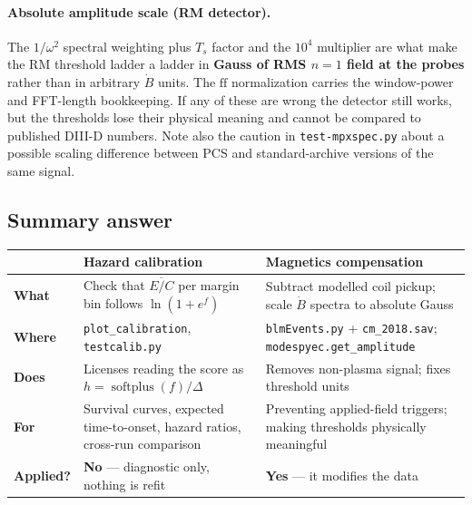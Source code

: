 \documentclass[11pt,a4paper]{article}
\newcommand{\code}[1]{\texttt{\small #1}}
\newcommand{\softplus}{\operatorname{softplus}}
\begin{document}
\paragraph{Absolute amplitude scale (RM detector).} The $1/\omega^2$ spectral weighting plus $T_s$
factor and the $10^4$ multiplier are what make the RM threshold ladder a ladder in \textbf{Gauss of
RMS $n{=}1$ field at the probes} rather than in arbitrary $\dot B$ units. The $\mathrm{ff}$
normalization carries the window-power and FFT-length bookkeeping. If any of these are wrong the
detector still works, but the thresholds lose their physical meaning and cannot be compared to
published DIII-D numbers. Note also the caution in \code{test-mpxspec.py} about a possible scaling
difference between PCS and standard-archive versions of the same signal.

\subsection{Summary answer}

\begin{center}
\begin{tabular}{@{}p{}p{}p{}@{}}
\toprule
& \textbf{Hazard calibration} & \textbf{Magnetics compensation} \\
\midrule
\textbf{What} & Check that $\overline{E/C}$ per margin bin follows $\ln(1+e^{f})$ & Subtract modelled coil pickup; scale $\dot B$ spectra to absolute Gauss \\
\textbf{Where} & \code{plot\_calibration}, \code{testcalib.py} & \code{blmEvents.py} + \code{cm\_2018.sav}; \code{modespyec.get\_amplitude} \\
\textbf{Does} & Licenses reading the score as $h = \softplus(f)/\Delta$ & Removes non-plasma signal; fixes threshold units \\
\textbf{For} & Survival curves, expected time-to-onset, hazard ratios, cross-run comparison & Preventing applied-field triggers; making thresholds physically meaningful \\
\textbf{Applied?} & \textbf{No} --- diagnostic only, nothing is refit & \textbf{Yes} --- it modifies the data \\
\bottomrule
\end{tabular}
\end{center}

\end{document}
